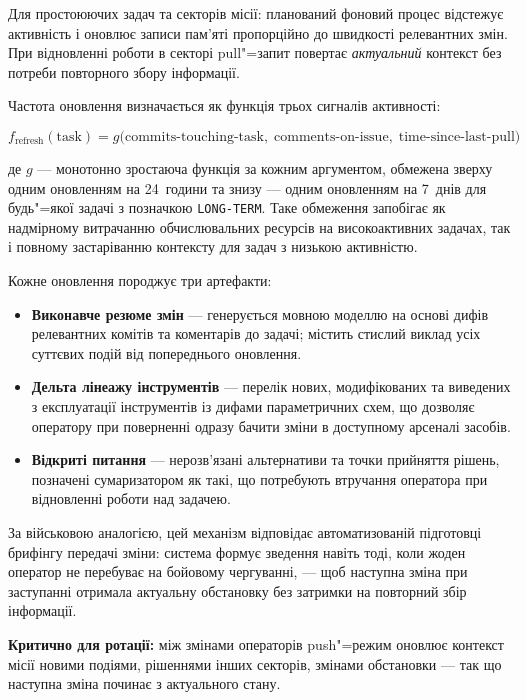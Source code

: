 \documentclass[11pt]{article}
\begin{document}
Для простоюючих задач та секторів місії: планований фоновий процес відстежує активність і оновлює записи пам'яті пропорційно до швидкості релевантних змін.
При відновленні роботи в секторі pull"=запит повертає \emph{актуальний} контекст без потреби повторного збору інформації.

Частота оновлення визначається як функція трьох сигналів активності:

\begin{equation}
  f_{\text{refresh}}(\text{task}) = g\bigl(
    \text{commits-touching-task},\;
    \text{comments-on-issue},\;
    \text{time-since-last-pull}
  \bigr)
  \label{eq:refresh}
\end{equation}

\noindent де $g$ --- монотонно зростаюча функція за кожним аргументом, обмежена зверху одним оновленням на 24~години та знизу --- одним оновленням на 7~днів для будь"=якої задачі з позначкою \texttt{LONG-TERM}.
Таке обмеження запобігає як надмірному витрачанню обчислювальних ресурсів на високоактивних задачах, так і повному застаріванню контексту для задач з низькою активністю.

Кожне оновлення породжує три артефакти:

\begin{itemize}[nosep]
  \item \textbf{Виконавче резюме змін} --- генерується мовною моделлю на основі дифів релевантних комітів та коментарів до задачі; містить стислий виклад усіх суттєвих подій від попереднього оновлення.
  \item \textbf{Дельта лінеажу інструментів} --- перелік нових, модифікованих та виведених з експлуатації інструментів із дифами параметричних схем, що дозволяє оператору при поверненні одразу бачити зміни в доступному арсеналі засобів.
  \item \textbf{Відкриті питання} --- нерозв'язані альтернативи та точки прийняття рішень, позначені сумаризатором як такі, що потребують втручання оператора при відновленні роботи над задачею.
\end{itemize}

За військовою аналогією, цей механізм відповідає автоматизованій підготовці брифінгу передачі зміни: система формує зведення навіть тоді, коли жоден оператор не перебуває на бойовому чергуванні, --- щоб наступна зміна при заступанні отримала актуальну обстановку без затримки на повторний збір інформації.

\textbf{Критично для ротації:} між змінами операторів push"=режим оновлює контекст місії новими подіями, рішеннями інших секторів, змінами обстановки --- так що наступна зміна починає з актуального стану.
\end{document}
